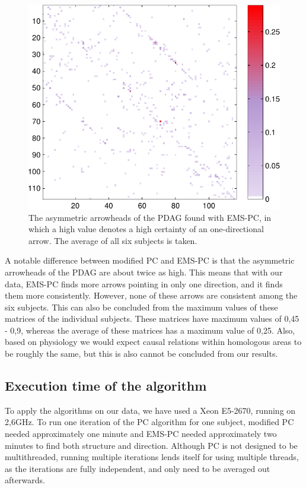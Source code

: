 \documentclass[a4paper, 10pt, english, onecolumn]{article}
\begin{document}
\begin{figure}[h!]
  \centering
  \includegraphics{images/arrowheads_avg_expl}
  \caption{The asymmetric arrowheads of the PDAG found with EMS-PC, in which a high value denotes a high certainty of an one-directional arrow. The average of all six subjects is taken.}
  \label{fig:pdag_avg_antisymmetric_ems}
\end{figure}

A notable difference between modified PC and EMS-PC is that the asymmetric arrowheads of the PDAG are about twice as high. %
This means that with our data, EMS-PC finds more arrows pointing in only one direction, and it finds them more consistently.
However, none of these arrows are consistent among the six subjects.
This can also be concluded from the maximum values of these matrices of the individual subjects.
These matrices have maximum values of 0,45 - 0,9, whereas the average of these matrices has a maximum value of 0,25.
Also, based on physiology we would expect causal relations within homologous areas to be roughly the same, but this is also cannot be concluded from our results.

\subsection{Execution time of the algorithm}
To apply the algorithms on our data, we have used a Xeon E5-2670, running on 2,6GHz.
To run one iteration of the PC algorithm for one subject, modified PC needed approximately one minute and EMS-PC needed approximately two minutes to find both structure and direction.
Although PC is not designed to be multithreaded, running multiple iterations lends itself for using multiple threads, as the iterations are fully independent, and only need to be averaged out afterwards.
\end{document}
